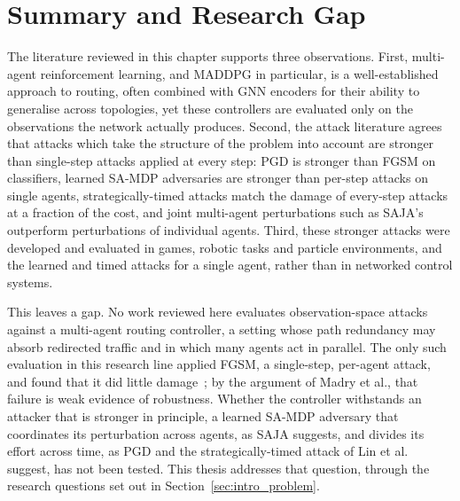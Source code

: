 \section{Summary and Research Gap}
\label{sec:lit_summary}

The literature reviewed in this chapter supports three observations. First,
multi-agent reinforcement learning, and MADDPG in particular, is a well-established
approach to routing, often combined with GNN encoders for their ability to generalise
across topologies, yet these controllers are evaluated only on the observations the
network actually produces. Second, the attack literature agrees that attacks which take
the structure of the problem into account are stronger than single-step attacks applied
at every step: PGD is stronger than FGSM on classifiers, learned SA-MDP adversaries are
stronger than per-step attacks on single agents, strategically-timed attacks match the
damage of every-step attacks at a fraction of the cost, and joint multi-agent
perturbations such as SAJA's outperform perturbations of individual agents. Third, these
stronger attacks were developed and evaluated in games, robotic tasks and particle
environments, and the learned and timed attacks for a single agent, rather than in
networked control systems.

This leaves a gap. No work reviewed here evaluates observation-space attacks against a
multi-agent routing controller, a setting whose path redundancy may absorb redirected
traffic and in which many agents act in parallel. The only such evaluation in this
research line applied FGSM, a single-step, per-agent attack, and found that it did
little damage~\cite{martins2026fgsm}; by the argument of Madry et al., that failure
is weak evidence of robustness. Whether the controller withstands an attacker that is
stronger in principle, a learned SA-MDP adversary that coordinates its perturbation
across agents, as SAJA suggests, and divides its effort across time, as PGD and the
strategically-timed attack of Lin et al.~\cite{lin2019tacticsadversarialattackdeep}
suggest, has not been tested. This thesis addresses that
question, through the research questions set out in Section~\ref{sec:intro_problem}.
